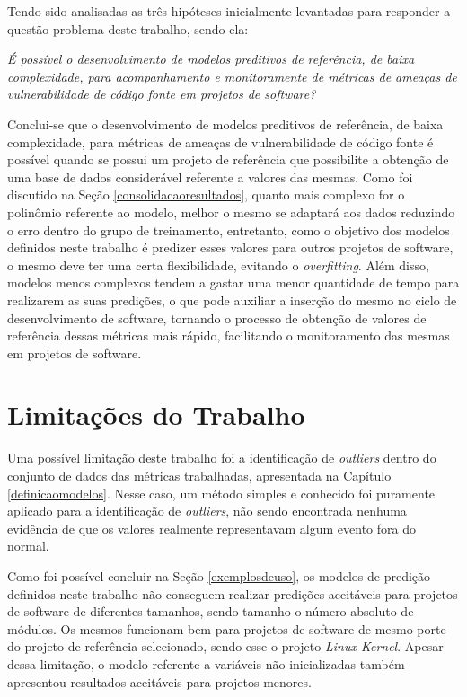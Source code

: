 Tendo sido analisadas as três hipóteses inicialmente levantadas para responder a
questão-problema deste trabalho, sendo ela: 

\begin{center}
  \textit{É possível o desenvolvimento de modelos preditivos de referência, de
  baixa complexidade, para acompanhamento e monitoramente de métricas de ameaças
de vulnerabilidade de código fonte em projetos de software?}
\end{center}

Conclui-se que o desenvolvimento de modelos preditivos de referência, de baixa
complexidade, para métricas de ameaças de vulnerabilidade de código fonte é
possível quando se possui um projeto de referência que possibilite a obtenção de
uma base de dados considerável referente a valores das mesmas. Como foi
discutido na Seção \ref{consolidacaoresultados}, quanto mais complexo for o
polinômio referente ao modelo, melhor o mesmo se adaptará aos dados reduzindo o
erro dentro do grupo de treinamento, entretanto, como o objetivo dos modelos
definidos neste trabalho é predizer esses valores para outros projetos de
software, o mesmo deve ter uma certa flexibilidade, evitando o
\textit{overfitting}. Além disso, modelos menos complexos tendem a gastar uma
menor quantidade de tempo para realizarem as suas predições, o que pode auxiliar a
inserção do mesmo no ciclo de desenvolvimento de software, tornando o processo
de obtenção de valores de referência dessas métricas mais rápido, facilitando o
monitoramento das mesmas em projetos de software.


\section{Limitações do Trabalho}

Uma possível limitação deste trabalho foi a identificação de \textit{outliers}
dentro do conjunto de dados das métricas trabalhadas, apresentada na Capítulo
\ref{definicaomodelos}. Nesse caso, um método simples e conhecido foi puramente
aplicado para a identificação de \textit{outliers}, não sendo encontrada nenhuma
evidência de que os valores realmente representavam algum evento fora do normal.

Como foi possível concluir na Seção \ref{exemplosdeuso}, os modelos de predição
definidos neste trabalho não conseguem realizar predições aceitáveis para
projetos de software de diferentes tamanhos, sendo tamanho o número absoluto de
módulos. Os mesmos funcionam bem para projetos de software de mesmo porte do
projeto de referência selecionado, sendo esse o projeto \textit{Linux Kernel}.
Apesar dessa limitação, o modelo referente a variáveis não inicializadas também
apresentou resultados aceitáveis para projetos menores.

